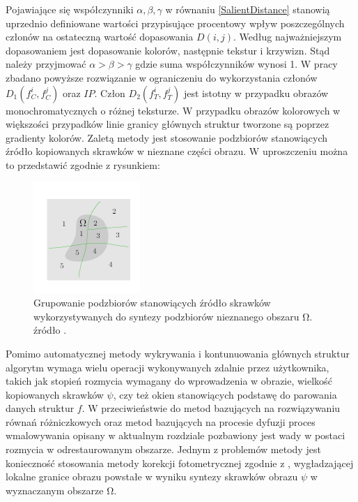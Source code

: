 \documentclass[12pt, twoside, openany]{report}
\theoremstyle{definition}
\begin{document}
Pojawiające się współczynniki $\alpha ,\beta ,\gamma $ w równaniu \eqref{SalientDistance} stanowią uprzednio definiowane wartości przypisujące procentowy wpływ poszczególnych członów na ostateczną wartość dopasowania $D(i,j)$. Według \cite{SalientStrucTexProp} najważniejszym dopasowaniem jest dopasowanie kolorów, następnie tekstur i krzywizn. Stąd należy przyjmować $\alpha >\beta >\gamma $ gdzie suma współczynników wynosi 1. W pracy zbadano powyższe rozwiązanie w ograniczeniu do wykorzystania członów $D_1\left(f^i_C,f^j_C\right)$ oraz $IP$. Człon $D_2\left(f^i_T,f^j_T\right)$ jest istotny w przypadku obrazów monochromatycznych o różnej teksturze. W przypadku obrazów kolorowych w większości przypadków linie granicy głównych struktur tworzone są poprzez gradienty kolorów. Zaletą metody jest stosowanie podzbiorów stanowiących źródło kopiowanych skrawków w nieznane części obrazu. W uproszczeniu można to przedstawić zgodnie z rysunkiem:
\begin{figure}[!h]
	\centering
	\includegraphics[scale=1]{rysunki/4_fig9}
	\caption{Grupowanie podzbiorów stanowiących źródło skrawków wykorzystywanych do syntezy podzbiorów nieznanego obszaru $\boldsymbol{\mathrm{\Omega }}$. źródło \cite{StructurePropagationManual}.}
\label{4_fig9}
\end{figure}
Pomimo automatycznej metody wykrywania i kontunuowania głównych struktur algorytm wymaga wielu operacji wykonywanych zdalnie przez użytkownika, takich jak stopień rozmycia wymagany do wprowadzenia w obrazie, wielkość kopiowanych skrawków $\psi $, czy też okien stanowiących podstawę do parowania danych struktur $f$. W przeciwieństwie do metod bazujących na rozwiązywaniu równań różniczkowych oraz metod bazujących na procesie dyfuzji proces wmalowywania opisany w aktualnym rozdziale pozbawiony jest wady w postaci rozmycia w odrestaurowanym obszarze. Jednym z problemów metody jest konieczność stosowania metody korekcji fotometrycznej zgodnie z \cite{StructurePropagationManual}, wygładzającej lokalne granice obrazu powstałe w wyniku syntezy skrawków obrazu $\psi $ w wyznaczanym obszarze $\mathrm{\Omega }$.
\end{document}
